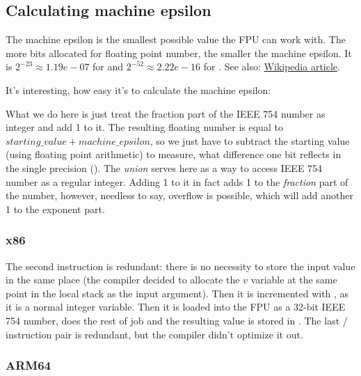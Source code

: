 ﻿\subsection{Calculating machine epsilon}

The machine epsilon is the smallest possible value the \ac{FPU} can work with.
The more bits allocated for floating point number, the smaller the machine epsilon.
It is $2^{-23} \approx 1.19e-07$ for \Tfloat and $2^{-52} \approx 2.22e-16$ for \Tdouble.
See also: \href{https://en.wikipedia.org/wiki/Arithmetic_underflow}{Wikipedia article}.

It's interesting, how easy it's to calculate the machine epsilon:



What we do here is just treat the fraction part of the IEEE 754 number as integer and add 1 to it.
The resulting floating number is equal to $starting\_value+machine\_epsilon$, so we just have to subtract
the starting value (using floating point arithmetic) to measure, what difference one bit reflects
in the single precision (\Tfloat).
The \emph{union} serves here as a way to access IEEE 754 number as a regular integer.
Adding 1 to it in fact adds 1 to the \emph{fraction} part of the number, however, needless to say,
overflow is possible, which will add another 1 to the exponent part.

\subsubsection{x86}



The second  instruction is redundant: there is no necessity to store the input value in the same
place (the compiler decided to allocate the $v$ variable at the same point in the local stack as the input 
argument).
Then it is incremented with , as it is a normal integer variable.
Then it is loaded into the FPU as a 32-bit IEEE 754 number,  does the rest of job and the resulting
value is stored in .
The last / instruction pair is redundant, but the compiler didn't optimize it out.

\subsubsection{ARM64}

